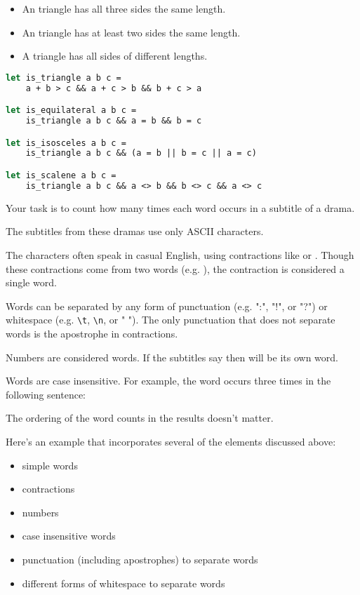 \begin{itemize}
  \item An  triangle has all three sides the same length.
  \item An  triangle has at least two sides the same length.
  \item A  triangle has all sides of different lengths.
\end{itemize}

\begin{lstlisting}[language=OCaml]
let is_triangle a b c =
	a + b > c && a + c > b && b + c > a

let is_equilateral a b c =
	is_triangle a b c && a = b && b = c

let is_isosceles a b c =
	is_triangle a b c && (a = b || b = c || a = c)

let is_scalene a b c =
	is_triangle a b c && a <> b && b <> c && a <> c
\end{lstlisting}

Your task is to count how many times each word occurs in a subtitle of a drama.

The subtitles from these dramas use only ASCII characters.

The characters often speak in casual English, using contractions like  or .
Though these contractions come from two words (e.g. ), the contraction  is considered a single word.

Words can be separated by any form of punctuation (e.g. ":", "!", or "?") or whitespace (e.g. \texttt{\textbackslash t}, \texttt{\textbackslash n}, or " ").
The only punctuation that does not separate words is the apostrophe in contractions.

Numbers are considered words.
If the subtitles say  then  will be its own word.

Words are case insensitive.
For example, the word  occurs three times in the following sentence:

\begin{quote}
\end{quote}

The ordering of the word counts in the results doesn't matter.

Here's an example that incorporates several of the elements discussed above:
\begin{itemize}
  \item simple words
  \item contractions
  \item numbers
  \item case insensitive words
  \item punctuation (including apostrophes) to separate words
  \item different forms of whitespace to separate words
\end{itemize}


